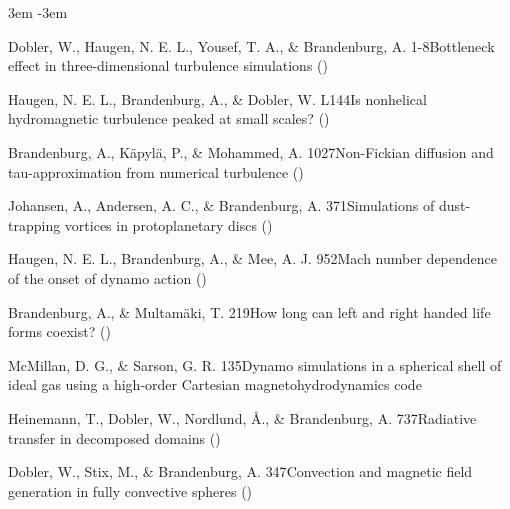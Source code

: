 \documentclass[\mydriver,12pt,twoside,notitlepage,a4paper]{article}
\begin{document}
\begin{list}{}{\leftmargin 3em \itemindent -3em\listparindent \itemindent
\itemsep 0pt \parsep 1pt}

\item
Dobler, W., Haugen, N. E. L., Yousef, T. A., \&
Brandenburg, A.
{1-8}{Bottleneck effect in three-dimensional turbulence simulations}
()

\item
Haugen, N. E. L., Brandenburg, A., \& Dobler, W.
{L144}{Is nonhelical hydromagnetic turbulence peaked at small scales?}
()

\item
Brandenburg, A., K\"apyl\"a, P., \& Mohammed, A.
{1027}{Non-Fickian diffusion and tau-approximation from numerical turbulence}
()

\item
Johansen, A., Andersen, A. C., \& Brandenburg, A.
{371}{Simulations of dust-trapping vortices in protoplanetary discs}
()

\item
Haugen, N. E. L., Brandenburg, A., \& Mee, A. J.
{952}{Mach number dependence of the onset of dynamo action}
()

\item
Brandenburg, A., \& Multam\"aki, T.
{219}{How long can left and right handed life forms coexist?}
()

\item
McMillan, D. G., \& Sarson, G. R.
{135}{Dynamo simulations in a spherical shell of ideal gas using a
high-order Cartesian magnetohydrodynamics code}

\item
Heinemann, T., Dobler, W., Nordlund, \AA., \&
Brandenburg, A.
{737}{Radiative transfer in decomposed domains}
()

\item
Dobler, W., Stix, M., \& Brandenburg, A.
{347}{Convection and magnetic field generation in fully convective spheres}
()


\end{list}
\end{document}

